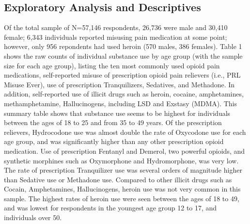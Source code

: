 \documentclass[sigconf]{acmart}
\begin{document}
\subsection{Exploratory Analysis and Descriptives}\cite{mckinney17}

Of the total sample of N=57,146 respondents, 26,736 were male and 30,410 
female; 6,343 individuals reported misusing pain medication at some point; 
however, only 956 repondents had used heroin (570 males, 386 females). Table 1 
shows the raw counts of individual substance use by age group (with the sample 
size for each age group), listing the ten most commonly used opioid pain 
medications, self-reported misuse of prescription opioid pain relievers (i.e., 
PRL Misuse Ever), use of prescription Tranquilizers, Sedatives, and Methadone. 
In addition, self-reported use of illicit drugs such as heroin, cocaine, 
amphetamines, methamphetamine, Hallucinogens, including LSD and Exstasy 
(MDMA). This summary table shows that substance use seems to be highest for 
individuals between the ages of 18 to 25 and from 35 to 49 years. Of the
prescription relievers, Hydrocodone use was almost double the rate of 
Oxycodone use for each age group, and was significantly higher than any other 
prescription opioid medication. Use of prescription Fentanyl and Demerol,
two powerful opioids, and synthetic morphines such as Oxymorphone and
Hydromorphone, was very low. The rate of prescription Tranquilizer use
was several orders of magnitude higher than Sedative use or Methadone use.
Compared to other illicit drugs such as Cocain, Amphetamines, Hallucinogens,
heroin use was not very common in this sample. The highest rates of heroin
use were seen between the ages of 18 to 49, and was lowest for respondents
in the youngest age group 12 to 17, and individuals over 50. 
\end{document}
